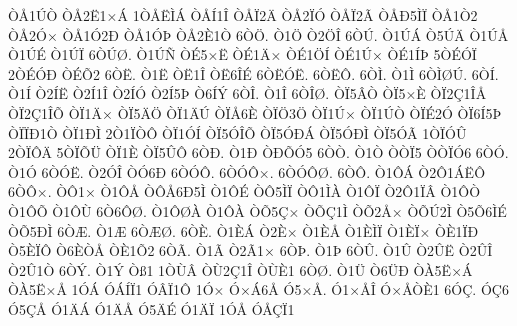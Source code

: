 {^^d2^^c51^^da^^d2
^^d2^^c52^^cb1^^d7^^c1
1^^d2^^c5^^cb^^cc^^c1
^^d2^^c5^^cd1^^ce
^^d2^^c5^^cf2^^c4
^^d2^^c52^^cf^^d3
^^d2^^c5^^cf2^^c3
^^d2^^c5^^d05^^cc^^cf
^^d2^^c51^^d22
^^d2^^c52^^d3^^d7
^^d2^^c51^^d32^^d0
^^d2^^c51^^d3^^de
^^d2^^c52^^c81^^d2
6^^d2^^d6.
^^d21^^d6
^^d22^^d6^^ce
6^^d2^^da.
^^d21^^da^^c1
^^d25^^da^^c4
^^d21^^da^^c5
^^d21^^da^^c9
^^d21^^da^^cf
6^^d2^^da^^d8.
^^d21^^da^^d1
^^d2^^c95^^d7^^cb
^^d2^^c91^^c4^^d7
^^d2^^c91^^d6^^cd
^^d2^^c91^^da^^d7
^^d2^^c91^^cd^^de
5^^d2^^c9^^d3^^cf
2^^d2^^c9^^d3^^d0
^^d2^^c9^^d52
6^^d2^^cb.
^^d21^^cb
^^d2^^cb1^^ce
^^d2^^cb6^^ce^^c9
6^^d2^^cb^^d3^^cb.
6^^d2^^cb^^d4.
6^^d2^^cc.
^^d21^^cc
6^^d2^^cc^^d8^^da.
6^^d2^^cd.
^^d21^^cd
^^d22^^cd^^cb
^^d22^^cd1^^ce
^^d22^^cd^^d3
^^d22^^cd5^^de
^^d26^^cd^^dd
6^^d2^^ce.
^^d21^^ce
6^^d2^^ce^^d8.
^^d2^^cf5^^c2^^d2
^^d2^^cf5^^d7^^c8
^^d2^^cf2^^c71^^ce^^c5
^^d2^^cf2^^c71^^ce^^d5
^^d2^^cf1^^c4^^d7
^^d2^^cf5^^c4^^d6
^^d2^^cf1^^c4^^da
^^d2^^cf^^c56^^c8
^^d2^^cf^^d63^^d6
^^d2^^cf1^^da^^d7
^^d2^^cf1^^da^^d2
^^d2^^cf^^c92^^d3
^^d2^^cf6^^cd5^^de
^^d2^^cf^^cf^^d01^^d2
^^d2^^cf1^^d0^^cc
2^^d21^^cf^^d2^^d4
^^d2^^cf1^^d3^^cd
^^d2^^cf5^^d3^^ce^^d5
^^d2^^cf5^^d3^^d0^^c1
^^d2^^cf5^^d3^^d0^^cc
^^d2^^cf5^^d3^^c3
1^^d2^^cf^^d3^^db
2^^d2^^cf^^d4^^c4
5^^d2^^cf^^d5^^dc
^^d2^^cf1^^c8
^^d2^^cf5^^db^^d4
6^^d2^^d0.
^^d21^^d0
^^d2^^d0^^d5^^d35
6^^d2^^d2.
^^d21^^d2
^^d2^^d2^^cf5
^^d2^^d2^^cf^^d36
6^^d2^^d3.
^^d21^^d3
6^^d2^^d3^^cb.
^^d22^^d3^^ce
^^d2^^d36^^d0
6^^d2^^d3^^d4.
6^^d2^^d3^^d4^^d7.
6^^d2^^d3^^d4^^d8.
6^^d2^^d4.
^^d21^^d4^^c1
^^d22^^d41^^c1^^cb^^d4
6^^d2^^d4^^d7.
^^d2^^d41^^d7
^^d21^^d4^^c5
^^d2^^d4^^c56^^d05^^cc
^^d21^^d4^^c9
^^d2^^d45^^cc^^cf
^^d2^^d41^^cc^^c0
^^d21^^d4^^cf
^^d22^^d41^^cf^^c2
^^d21^^d4^^d2
^^d21^^d4^^d5
^^d21^^d4^^d9
6^^d26^^d4^^d8.
^^d21^^d4^^d8^^c0
^^d21^^d4^^c0
^^d2^^d55^^c7^^d7
^^d2^^d5^^c71^^cc
^^d2^^d52^^c5^^d7
^^d2^^d5^^da2^^cc
^^d25^^d56^^cc^^c9
^^d2^^d55^^d0^^cc
6^^d2^^c6.
^^d21^^c6
6^^d2^^c6^^d8.
6^^d2^^c8.
^^d21^^c8^^c1
^^d22^^c8^^d7
^^d21^^c8^^c5
^^d21^^c8^^cc^^cf
^^d21^^c8^^cf^^d7
^^d2^^c81^^cf^^d0
^^d25^^c8^^cf^^d4
^^d26^^c8^^d2^^c5
^^d2^^c81^^d52
6^^d2^^c3.
^^d21^^c3
^^d22^^c31^^d7
6^^d2^^de.
^^d21^^de
6^^d2^^db.
^^d21^^db
^^d22^^db^^cb
^^d22^^db^^ce
^^d22^^db1^^d2
6^^d2^^dd.
^^d21^^dd
^^d2^^df1
1^^d2^^d9^^c2
^^d2^^d92^^c71^^ce
^^d2^^d9^^c81
6^^d2^^d8.
^^d21^^dc
^^d26^^dc^^d0
^^d2^^c05^^cb^^d7^^c1
^^d2^^c05^^cb^^d7^^c5
1^^d3^^c1
^^d3^^c1^^cd^^cf1
^^d3^^c2^^cf1^^d4
1^^d3^^d7
^^d3^^d7^^c16^^c5
^^d35^^d7^^c5.
^^d31^^d7^^c5^^ce
^^d3^^d7^^c5^^d2^^c81
6^^d3^^c7.
^^d3^^c76
^^d35^^c7^^c5
^^d31^^c4^^c1
^^d31^^c4^^c5
^^d35^^c4^^c9
^^d31^^c4^^cf
1^^d3^^c5
^^d3^^c5^^c7^^cf1
}
